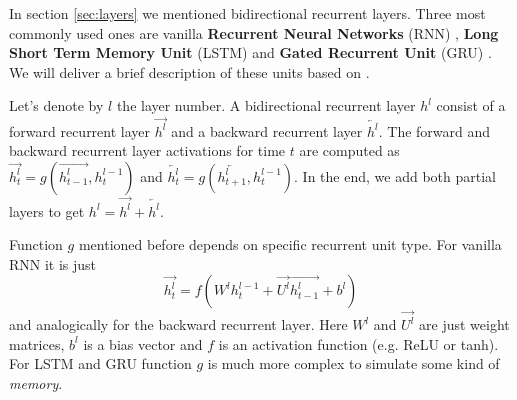 \documentclass[licencjacka,en]{pracamgr}
\begin{document}
\lstm

In section \ref{sec:layers} we mentioned bidirectional recurrent layers. Three most commonly used ones are vanilla \textbf{Recurrent Neural Networks} (RNN) \cite{RNN}, \textbf{Long Short Term Memory Unit} (LSTM) \cite{LSTM} and \textbf{Gated Recurrent Unit} (GRU) \cite{GRU}. We will deliver a brief description of these units based on \cite{DS2}.

Let's denote by $l$ the layer number. A bidirectional recurrent layer $h^l$ consist of a forward recurrent layer $\overrightarrow{h^l}$ and a backward recurrent layer $\overleftarrow{h^l}$. The forward and backward recurrent layer activations for time $t$ are computed as $\overrightarrow{h^l_t} = g(\overrightarrow{h^l_{t - 1}}, h^{l-1}_t)$ and $\overleftarrow{h^l_t} = g(\overleftarrow{h^l_{t+1}}, h^{l-1}_t)$. In the end, we add both partial layers to get $h^l = \overrightarrow{h^l} + \overleftarrow{h^l}$.

Function $g$ mentioned before depends on specific recurrent unit type. For vanilla RNN it is just
$$\overrightarrow{h^l_t} = f(W^l h^{l-1}_t + \overrightarrow{U^l} \overrightarrow{h^l_{t - 1}} + b^l)$$
and analogically for the backward recurrent layer. Here $W^l$ and $\overrightarrow{U^l}$ are just weight matrices, $b^l$ is a bias vector and $f$ is an activation function (e.g. ReLU or tanh). For LSTM and GRU function $g$ is much more complex to simulate some kind of \textit{memory}.
\end{document}
